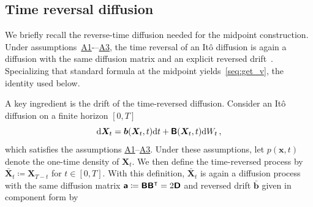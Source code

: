 
\subsection{Time reversal diffusion}
\vspace*{-0.5\baselineskip}
We briefly recall the reverse-time diffusion needed for the midpoint construction. Under assumptions~\hyperlink{assumption:A1}{A1}-–\hyperlink{assumption:A3}{A3}, the time reversal of an It\^{o} diffusion is again a diffusion with the same diffusion matrix and an explicit reversed drift~\cite{anderson1982reverse,haussmann1986time}. Specializing that standard formula at the midpoint yields~\eqref{seq:get_v}, the identity used below.

A key ingredient is the drift of the time-reversed diffusion. Consider an It\^{o} diffusion on a finite horizon $\left[0, T\right]$
\begin{equation*}
    \mathrm{d}\bm{X}_t=\bm{b}(\bm{X}_t,t)\mathrm{d}t+\boldsymbol{\mathsf{B}}(\bm{X}_t,t)\mathrm{d}W_t\,,
\end{equation*}
which satisfies the assumptions \hyperlink{assumption:A1}{A1}--\hyperlink{assumption:A3}{A3}.
Under these assumptions, let $p(\bm{x}, t)$ denote the one-time density of $\bm{X}_t$. 
We then define the time-reversed process by $\bar{\bm{X}}_t \coloneq \bm{X}_{T-t}$ for $t \in [0, T]$. 
With this definition, $\bar{\bm{X}}_t$ is again a diffusion process with the same diffusion matrix $\boldsymbol{\mathsf{a}}\coloneq\boldsymbol{\mathsf{B}}\boldsymbol{\mathsf{B}}^\intercal=2\boldsymbol{\mathsf{D}}$ and reversed drift $\bar{\bm{b}}$ given in component form by

